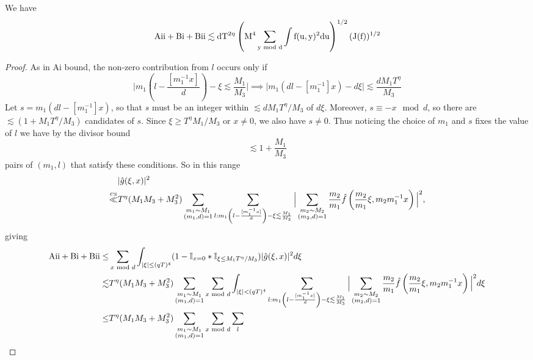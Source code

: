 \begin{lemma}\label{affineweirdterm}
    We have
    \[
    \rm{Aii}+\rm{Bi}+\rm{Bii}\lesssim dT^{2\eta}\left(M^4 \sum_{y\mod d}\int f(u,y)^2 du\right)^{1/2} (J(f))^{1/2}
    \]
\end{lemma}
\begin{proof}
    As in Ai bound, the non-zero contribution from $l$ occurs only if \[
        \Bigg|m_1\left(l-\frac{[m_1^{-1}x]}{d}\right)- \xi \lesssim \frac{M_1}{M_3} \Bigg|\implies
        \Bigg|m_1\left(dl-[m_1^{-1}]x\right) -d\xi\Bigg|\lesssim\frac{dM_1T^\eta}{M_3}
    \]
    Let $s=m_1\left(dl-[m_1^{-1}]x\right) $, so that $s$ must be an integer within $\lesssim{dM_1T^\eta}/{M_3}$ of $d\xi$. Moreover, $s\equiv -x \mod d$, so there are $\lesssim (1+M_1T^\eta/M_3)$ candidates of $s$. Since $\xi\geq T^\eta M_1/M_3$ or $x\neq 0$, we also have $s\neq 0$. Thus noticing the choice of $m_1$ and $s$ fixes the value of $l$ we have by the divisor bound \[
    \lesssim 1+\frac{M_1}{M_3}
    \]
    pairs of $(m_1,l)$ that satisfy these conditions. So in this range 
    \begin{align*}
        &|\hat{g}(\xi,x)|^2 \\
        \stackon{CS}{\ll}&T^\eta(M_1M_3+M_3^2)
        \sum_{\substack{m_1\sim M_1\\(m_1,d)=1}}  \sum_{l : m_1\left(l-\frac{[m_1^{-1}x]}{d}\right)- \xi \lesssim \frac{M_1}{M_3} } 
        \Big|
            \sum_{\substack{m_2\sim M_2\\(m_2,d)=1}} \frac{m_2}{m_1}\hat{f}\left(\frac{m_2}{m_1}\xi, m_2m_1^{-1}x\right) 
            \Big|^2,\\
    \end{align*}
    giving 
    \begin{align*}
        \rm{Aii}+{Bi}+{Bii}\leq&\sum_{x \mod d}\int_{|\xi|\leq (qT)^4} (1-\mathbb{I}_{x=0}*\mathbb{I}_{\xi\leq M_1T^{\eta}/M_3})|\hat{g}(\xi,x)|^2 d\xi\\
        {\lesssim}&T^\eta(M_1M_3+M_3^2)
        \sum_{\substack{m_1\sim M_1\\(m_1,d)=1}} \sum_{x \mod d} \int_{|\xi|<(qT)^4}\sum_{l : m_1\left(l-\frac{[m_1^{-1}x]}{d}\right)- \xi \lesssim \frac{M_1}{M_3} } 
        \Big|
            \sum_{\substack{m_2\sim M_2\\(m_2,d)=1}} \frac{m_2}{m_1}\hat{f}\left(\frac{m_2}{m_1}\xi, m_2m_1^{-1}x\right) 
            \Big|^2d\xi\\
            \leq&T^\eta(M_1M_3+M_3^2)
            \sum_{\substack{m_1\sim M_1\\(m_1,d)=1}} \sum_{x \mod d} \sum_{l} 

\end{align*}
\end{proof}
